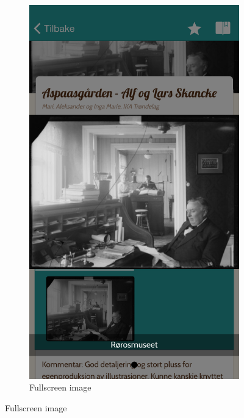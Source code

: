 \begin{appendices}
\begin{figure}[h]
\begin{subfigure}[h]{0.3\textwidth}
			\includegraphics[width=\textwidth]{fig/screenshot_image}
			\caption{Fullscreen image}
		\end{subfigure}
	

\end{figure}
\end{appendices}
